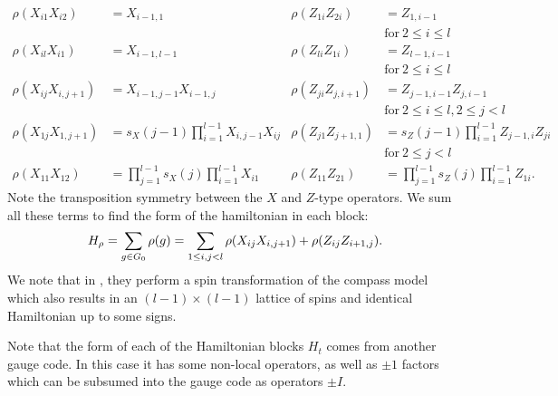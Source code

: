 \documentclass[12pt]{article}
\renewenvironment{framed}[1][\hsize]{%
\def\FrameCommand{{\color{black}\vrule width 3pt}\hspace{0pt}\fboxsep=\FrameSep\colorbox{lightgray}}%
\MakeFramed{\hsize0.8\linewidth\advance\hsize-\width\FrameRestore}}
{\endMakeFramed}
\begin{document}
\begin{align*}
\rho(X_{i1} X_{i2}) &= X_{i-1,1} &
\rho(Z_{1i} Z_{2i}) &= Z_{1,i-1} \\&&&\mbox{for}\ 2\le i\le l\\
\rho(X_{il} X_{i1}) &= X_{i-1,l-1} &
\rho(Z_{li} Z_{1i}) &= Z_{l-1,i-1} \\&&&\mbox{for}\ 2\le i\le l\\
\rho(X_{ij} X_{i,j+1}) &= X_{i-1,j-1} X_{i-1,j} &
\rho(Z_{ji} Z_{j,i+1}) &= Z_{j-1,i-1}Z_{j,i-1} \\&&&\mbox{for}\ 2\le i\le l, 2\le j<l\\
\rho(X_{1j} X_{1,j+1}) &= s_X(j-1) \prod_{i=1}^{l-1} X_{i,j-1} X_{ij} &
\rho(Z_{j1} Z_{j+1,1}) &= s_Z(j-1) \prod_{i=1}^{l-1} Z_{j-1,i} Z_{ji} \\&&&\mbox{for}\ 2\le j<l\\
\rho(X_{11} X_{12}) &= \prod_{j=1}^{l-1}s_X(j) \prod_{i=1}^{l-1} X_{i1} &
\rho(Z_{11} Z_{21}) &= \prod_{j=1}^{l-1}s_Z(j) \prod_{i=1}^{l-1} Z_{1i}.
\end{align*}
Note the transposition symmetry between the $X$ and $Z$-type operators.
We sum all these terms to find 
the form of the hamiltonian in each block:
$$
H_\rho = \sum_{g\in G_0} \rho(g) = \sum_{1\le i,j<l} \rho(X_{ij}X_{i,j+1}) + \rho(Z_{ij}Z_{i+1,j}).
$$
We note that in \cite{Brzezicki2013},
they perform a
spin transformation of the compass model
which also results in an $(l-1)\times(l-1)$ lattice
of spins and identical Hamiltonian up to some signs.

Note that the form of each of the Hamiltonian blocks $H_t$
comes from another gauge code.
In this case it has some non-local operators, as well as $\pm 1$ factors
which can be subsumed into the gauge code as operators $\pm I.$

%
%
%
%
\end{document}
